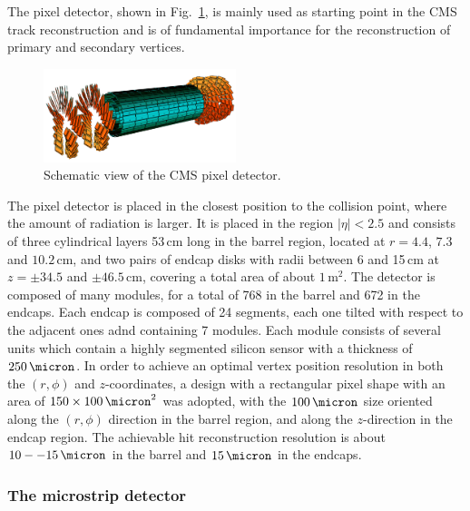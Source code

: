 The pixel detector, shown in Fig.~\ref{fig:pixel}, is mainly used as starting point in the CMS track reconstruction and is of fundamental importance for the reconstruction of primary and secondary vertices. 
\begin{figure}[htb]
\centering
\includegraphics[width=0.5\textwidth]{images/pixel.png}
\caption{Schematic view of the CMS pixel detector.}\label{fig:pixel}
\end{figure}
The pixel detector is placed in the closest position to the collision point, where the amount of radiation is larger. It is placed in the region $|\eta|<2.5$ and consists of three cylindrical layers 53\,cm long in the barrel region, located at $r=4.4$, $7.3$ and $10.2$\,cm, and two pairs of endcap disks with radii between 6 and 15\,cm at $z=\pm34.5$ and $\pm46.5$\,cm, covering a total area of about $1\,\mathrm{m^2}$. The detector is composed of many modules, for a total of 768 in the barrel and 672 in the endcaps. Each endcap is composed of 24 segments, each one tilted with respect to the adjacent ones adnd containing 7 modules. Each module consists of several units which contain a highly segmented silicon sensor with a thickness of $250\,\micron$. In order to achieve an optimal vertex position resolution in both the $(r,\phi)$ and $z$-coordinates, a design with a rectangular pixel shape with an area of $150\times100\,\micron^2$ was adopted, with the $100\,\micron$ size oriented along the $(r,\phi)$ direction in the barrel region, and along the $z$-direction in the endcap region. The achievable hit reconstruction resolution is about $10--15\,\micron$ in the barrel and $15\,\micron$ in the endcaps.

\subsubsection{The microstrip detector}

